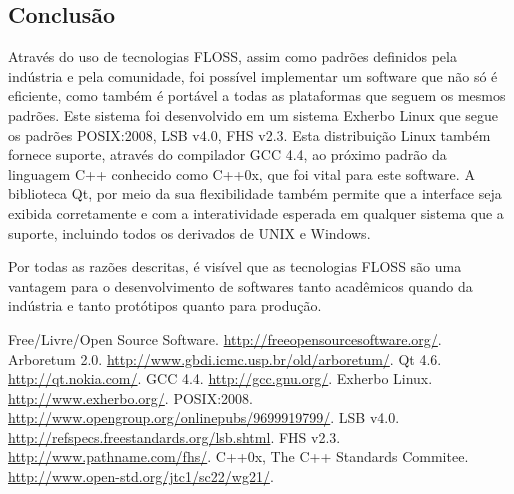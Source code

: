 \documentclass[10pt,a4paper]{article}
\begin{document}
\begin{titlepage}
\begin{multicols}{2}
\section{Conclusão}

Através do uso de tecnologias FLOSS\cite{FLOSS}, assim como padrões definidos pela
indústria e pela comunidade, foi possível implementar um software que não só é eficiente,
como também é portável a todas as plataformas que seguem os mesmos padrões. Este
sistema foi desenvolvido em um sistema Exherbo Linux\cite{exherbo} que segue os padrões
POSIX:2008\cite{posix08}, LSB v4.0\cite{lsb4}, FHS v2.3\cite{fhs23}. Esta distribuição Linux
também fornece suporte, através do compilador GCC 4.4\cite{gcc4}, ao próximo padrão da
linguagem C++ conhecido como C++0x\cite{cpp0x}, que foi vital para este software. A biblioteca
Qt\cite{qt4}, por meio da sua flexibilidade também permite que a interface seja exibida corretamente
e com a interatividade esperada em qualquer sistema que a suporte, incluindo todos os derivados de
UNIX e Windows.

Por todas as razões descritas, é visível que as tecnologias FLOSS são uma vantagem para o
desenvolvimento de softwares tanto acadêmicos quando da indústria e tanto protótipos quanto
para produção.

\begin{thebibliography}{99}

	 Free/Livre/Open Source Software. \url{http://freeopensourcesoftware.org/}.
	 Arboretum 2.0. \url{http://www.gbdi.icmc.usp.br/old/arboretum/}.
	 Qt 4.6. \url{http://qt.nokia.com/}.
	 GCC 4.4. \url{http://gcc.gnu.org/}.
	 Exherbo Linux. \url{http://www.exherbo.org/}.
         POSIX:2008. \url{http://www.opengroup.org/onlinepubs/9699919799/}.
	 LSB v4.0. \url{http://refspecs.freestandards.org/lsb.shtml}.
	 FHS v2.3. \url{http://www.pathname.com/fhs/}.
	 C++0x, The C++ Standards Commitee. \url{http://www.open-std.org/jtc1/sc22/wg21/}.

\end{thebibliography}
\end{multicols}
\end{titlepage}
\end{document}
